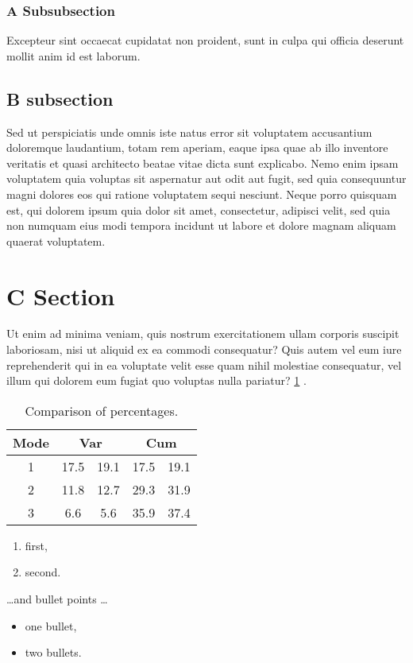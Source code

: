\subsubsection{A Subsubsection}
Excepteur sint occaecat cupidatat non proident, sunt in culpa qui officia deserunt mollit anim id est laborum.
\subsection{B subsection}
Sed ut perspiciatis unde omnis iste natus error sit voluptatem accusantium doloremque laudantium, totam rem aperiam, eaque ipsa quae ab illo inventore veritatis et quasi architecto beatae vitae dicta sunt explicabo. Nemo enim ipsam voluptatem quia voluptas sit aspernatur aut odit aut fugit, sed quia consequuntur magni dolores eos qui ratione voluptatem sequi nesciunt. Neque porro quisquam est, qui dolorem ipsum quia dolor sit amet, consectetur, adipisci velit, sed quia non numquam eius modi tempora incidunt ut labore et dolore magnam aliquam quaerat voluptatem. 

\section{C Section}
Ut enim ad minima veniam, quis nostrum exercitationem ullam corporis suscipit laboriosam, nisi ut aliquid ex ea commodi consequatur? Quis autem vel eum iure reprehenderit qui in ea voluptate velit esse quam nihil molestiae consequatur, vel illum qui dolorem eum fugiat quo voluptas nulla pariatur? \ref{tab:widgetss} \cite{One, Two, Three}.

\begin{table}[!htbp]
\centering
\caption{\label{tab:widgetss}Comparison of percentages.}
\begin{tabular}{c|cc|cc}
\hline
Mode &  \multicolumn{2}{c}{Var} & \multicolumn{2}{c}{Cum}\\ 
\hline
1   &  17.5 & 19.1   & 17.5  & 19.1\\
2   &  11.8 & 12.7   & 29.3  & 31.9\\
3   &  6.6  &  5.6   & 35.9  & 37.4\\
\end{tabular}
\end{table}

\begin{enumerate}
\item first,
\item second.
\end{enumerate}
\dots and bullet points \dots
\begin{itemize}
\item one bullet,
\item two bullets.
\end{itemize}

